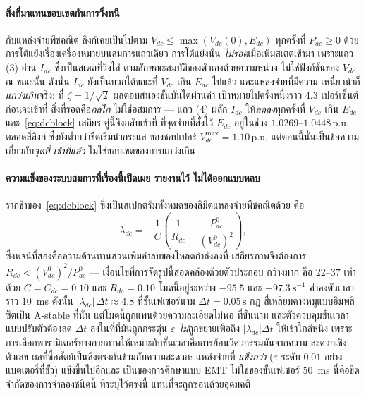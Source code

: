 \documentclass[12pt,a4paper]{article}
\newcommand{\pu}{\,\mathrm{p.u.}}
\newcommand{\second}{\,\mathrm{s}}
\begin{document}
\paragraph{สิ่งที่มาแทนขอบเขตกันการวิ่งหนี}
กับแหล่งจ่ายพีชคณิต ลิงก์เคยเป็นไปตาม $V_{dc}\le\max(V_{dc}(0),E_{dc})$ ทุกครั้งที่
$P_{ac}\ge0$ ด้วยการโต้แย้งเรื่องเครื่องหมายบนสมการแถวเดียว การโต้แย้งนั้น
\emph{ไม่รอด}เมื่อเพิ่มสเตตเข้ามา เพราะแถว (3) อ่าน $I_{dc}$ ซึ่งเป็นสเตตที่วิ่งไล่
ตามลักษณะสมบัติของตัวเองด้วยความหน่วง ไม่ใช่ฟังก์ชันของ $V_{dc}$ ณ ขณะนั้น ดังนั้น
$I_{dc}$ ยังเป็นบวกได้ขณะที่ $V_{dc}$ เกิน $E_{dc}$ ไปแล้ว และแหล่งจ่ายที่มีความ
เหนี่ยวนำก็\emph{แกว่งเกิน}จริง: ที่ $\zeta=1/\sqrt2$ ผลตอบสนองขั้นบันไดผ่านค่า
เป้าหมายไปครั้งหนึ่งราว $4.3$ เปอร์เซ็นต์ก่อนจะเข้าที่ สิ่งที่รอดคือ\emph{กลไก}
ไม่ใช่อสมการ --- แถว (4) ผลัก $I_{dc}$ ให้\emph{ลดลง}ทุกครั้งที่ $V_{dc}$ เกิน
$E_{dc}$ และ~\eqref{eq:dcblock} เสถียร คู่นี้จึงกลับเข้าที่ ที่จุดจ่ายที่สั่งไว้
$E_{dc}$ อยู่ในช่วง $1.0269$--$1.0448\pu$ ตลอดสี่ลิงก์ ซึ่งยังต่ำกว่าขีดเริ่มนำกระแส
ของชอปเปอร์ $V_{dc}^{\max}=1.10\pu$ แต่ตอนนี้นั่นเป็นข้อความเกี่ยวกับ\emph{จุดที่
เข้าที่แล้ว} ไม่ใช่ขอบเขตของการแกว่งเกิน

\paragraph{ความแข็งของระบบสมการที่เรื่องนี้เปิดเผย รายงานไว้ ไม่ได้ออกแบบหลบ}
รากช้าของ~\eqref{eq:dcblock} ซึ่งเป็นสเปกตรัมทั้งหมดของลิมิตแหล่งจ่ายพีชคณิตด้วย คือ
\begin{equation}
  \lambda_{dc}=-\frac{1}{C}\left(\frac{1}{R_{dc}}-\frac{P_{ac}^{0}}{(V_{dc}^{0})^{2}}\right),
  \label{eq:dclam}
\end{equation}
ซึ่งพจน์ที่สองคือความต้านทานส่วนเพิ่มค่าลบของโหลดกำลังคงที่ เสถียรภาพจึงต้องการ
$R_{dc}<(V_{dc}^{0})^{2}/P_{ac}^{0}$ --- เงื่อนไขที่การจัดรูปนี้สอดคล้องด้วยตัวประกอบ
กว้างมาก คือ $22$--$37$ เท่า ด้วย $C=C_{dc}=0.10$ และ $R_{dc}=0.10$ โมดนี้อยู่ระหว่าง
$-95.5$ และ $-97.3~\mathrm{s^{-1}}$ ค่าคงตัวเวลาราว $10$~ms ดังนั้น
$|\lambda_{dc}|\,\Delta t\approx4.8$ ที่ขั้นเฟเซอร์นาม $\Delta t=0.05\second$ กฎ
สี่เหลี่ยมคางหมูแบบอิมพลิซิตเป็น A-stable ที่นั่น แต่โมดนี้ถูกแทนด้วยความละเอียดไม่พอ
ที่ขั้นนาม และตัวควบคุมขั้นเวลาแบบปรับตัวต้องลด $\Delta t$ ลงในที่ที่มันถูกกระตุ้น
$\varepsilon$ \emph{ไม่}ถูกขยายเพื่อดึง $|\lambda_{dc}|\Delta t$ ให้เข้าใกล้หนึ่ง
เพราะการเลือกพารามิเตอร์ทางกายภาพให้เหมาะกับขั้นเวลาคือการย้อนวิศวกรรมมันจากความ
สะดวกเชิงตัวเลข ผลที่ซื่อสัตย์เป็นสิ่งตรงกันข้ามกับความสะดวก: แหล่งจ่ายที่
\emph{แข็งกว่า} ($\varepsilon$ ระดับ $0.01$ อย่างแบตเตอรี่ที่ขั้ว) แข็งขึ้นไปอีกและ
เป็นของการศึกษาแบบ EMT ไม่ใช่ของขั้นเฟเซอร์ $50$~ms นี่คือขีดจำกัดของการจำลองชนิดนี้
ที่ระบุไว้ตรงนี้ แทนที่จะถูกซ่อนด้วยอุดมคติ
\end{document}
